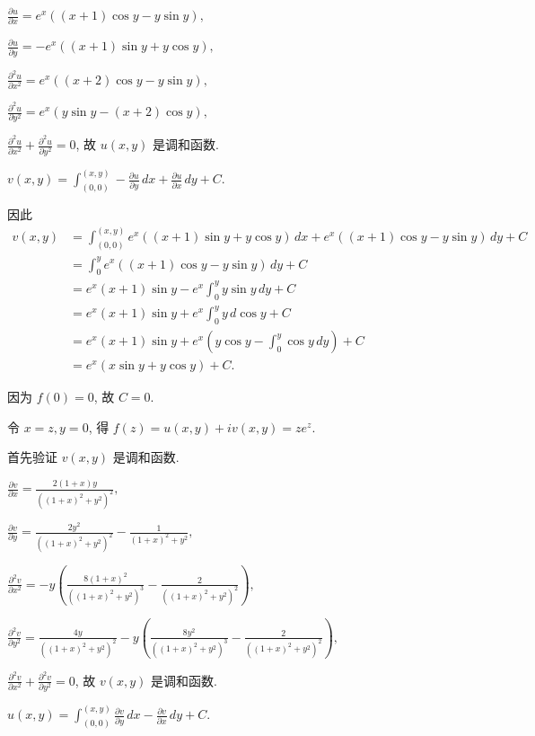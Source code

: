 \documentclass{homework}
\begin{document}
\(\frac{\partial u}{\partial x}=e^x ((x + 1) \cos y - y \sin y),\)

\(\frac{\partial u}{\partial y}=-e^x ((x + 1) \sin y + y \cos y),\)

\(\frac{\partial^2 u}{\partial x^2}=e^x ((x + 2) \cos y - y \sin y),\)

\(\frac{\partial^2 u}{\partial y^2}=e^x (y \sin y - (x + 2) \cos y),\)

\(\frac{\partial^2 u}{\partial x^2}+\frac{\partial^2 u}{\partial y^2}=0\), 故 \(u(x, y)\) 是调和函数.

\(v(x,y)=\int_{(0,0)}^{(x,y)}-\frac{\partial u}{\partial y}\,dx+\frac{\partial u}{\partial x}\,dy+C\).

因此
\begin{align*}
  v(x,y)&=\int_{(0,0)}^{(x,y)}e^x ((x + 1) \sin y + y \cos y)\,dx+e^x ((x + 1) \cos y - y \sin y)\,dy+C\\
  &=\int_{0}^{y}e^x ((x + 1) \cos y - y \sin y)\,dy+C\\
  &=e^x(x+1)\sin y-e^x\int_{0}^{y} y\sin y\,dy+C\\
  &=e^x(x+1)\sin y+e^x\int_{0}^{y} y\,d\cos y+C\\
  &=e^x(x+1)\sin y+e^x\left(y\cos y-\int_{0}^{y} \cos y\,dy\right)+C\\
  &=e^x(x\sin y+y\cos y)+C.
\end{align*}

因为 \(f(0)=0\), 故 \(C=0\).

令 \(x=z, y=0\), 得 \(f(z)=u(x,y)+iv(x,y)=ze^z\).

首先验证 \(v(x, y)\) 是调和函数.

\(\frac{\partial v}{\partial x}=\frac{2 (1+x) y}{\left((1+x)^2+y^2\right)^2},\)

\(\frac{\partial v}{\partial y}=\frac{2 y^2}{((1 + x)^2 + y^2)^2}-\frac{1}{(1 + x)^2 + y^2},\)

\(\frac{\partial^2 v}{\partial x^2}=-y \left(\frac{8 (1+x)^2}{\left((1+x)^2+y^2\right)^3}-\frac{2}{\left((1+x)^2+y^2\right)^2}\right),\)

\(\frac{\partial^2 v}{\partial y^2}=\frac{4 y}{\left((1+x)^2+y^2\right)^2}-y \left(\frac{8 y^2}{\left((1+x)^2+y^2\right)^3}-\frac{2}{\left((1+x)^2+y^2\right)^2}\right),\)

\(\frac{\partial^2 v}{\partial x^2}+\frac{\partial^2 v}{\partial y^2}=0\), 故 \(v(x, y)\) 是调和函数.

\(u(x,y)=\int_{(0,0)}^{(x,y)}\frac{\partial v}{\partial y}\,dx-\frac{\partial v}{\partial x}\,dy+C\).
\end{document}
